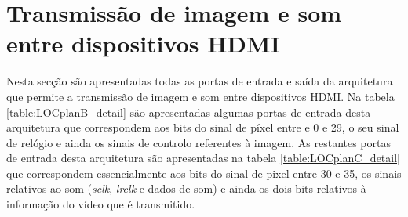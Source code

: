 
\section{Transmissão de imagem e som entre dispositivos HDMI} \label{ap3:imagem_som_RX_TX}

Nesta secção são apresentadas todas as portas de entrada e saída da arquitetura que permite a transmissão de imagem e som entre dispositivos HDMI. Na tabela \ref{table:LOCplanB_detail} são apresentadas algumas portas de entrada desta arquitetura que correspondem aos bits do sinal de píxel entre e 0 e 29, o seu sinal de relógio e ainda os sinais de controlo referentes à imagem. As restantes portas de entrada desta arquitetura são apresentadas na tabela \ref{table:LOCplanC_detail} que correspondem essencialmente aos bits do sinal de pixel entre 30 e 35, os sinais relativos ao som (\textit{sclk}, \textit{lrclk} e dados de som) e ainda os dois bits relativos à informação do vídeo que é transmitido.

